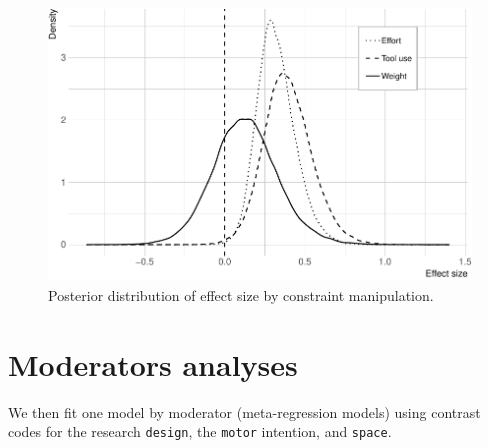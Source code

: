 \documentclass[floatsintext,doc]{apa6}
\newenvironment{Shaded}{\begin{snugshade}}{\end{snugshade}}
\newcommand{\CommentTok}[1]{\textcolor[rgb]{0.56,0.35,0.01}{\textit{#1}}}
\newcommand{\DecValTok}[1]{\textcolor[rgb]{0.00,0.00,0.81}{#1}}
\newcommand{\FloatTok}[1]{\textcolor[rgb]{0.00,0.00,0.81}{#1}}
\newcommand{\KeywordTok}[1]{\textcolor[rgb]{0.13,0.29,0.53}{\textbf{#1}}}
\newcommand{\NormalTok}[1]{#1}
\newcommand{\OperatorTok}[1]{\textcolor[rgb]{0.81,0.36,0.00}{\textbf{#1}}}
\newcommand{\StringTok}[1]{\textcolor[rgb]{0.31,0.60,0.02}{#1}}
\begin{document}
\begin{figure}[H]

{\centering \includegraphics[width=0.75\linewidth]{supplementary_materials_files/figure-latex/unnamed-chunk-12-1} 

}

\caption{Posterior distribution of effect size by constraint manipulation.}\label{fig:unnamed-chunk-12}
\end{figure}

\hypertarget{moderators-analyses}{%
\section{Moderators analyses}\label{moderators-analyses}}

We then fit one model by moderator (meta-regression models) using contrast codes for the research \texttt{design}, the \texttt{motor} intention, and \texttt{space}.

\begin{Shaded}
\end{Shaded}
\end{document}
